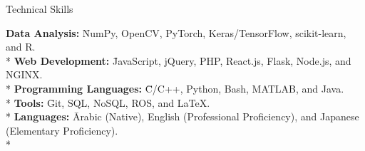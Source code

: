 \begin{resume_section}{Technical Skills}
\begin{nospacetabbing}
  \textbf{Data Analysis:}  \= NumPy, OpenCV, PyTorch, Keras/TensorFlow, scikit-learn, and R. \\*
  \textbf{Web Development:} \= JavaScript, jQuery, PHP, React.js, Flask, Node.js, and NGINX.\\*
  \textbf{Programming Languages:} \= C/C++, Python, Bash, MATLAB, and Java.\\*
  \textbf{Tools:} \= Git, SQL, NoSQL, ROS, and \LaTeX.\\*
  \textbf{Languages:} \= Arabic (Native), English (Professional Proficiency), and Japanese (Elementary Proficiency).\\*
  \end{nospacetabbing}
    \vspace{-.5cm}
\end{resume_section}